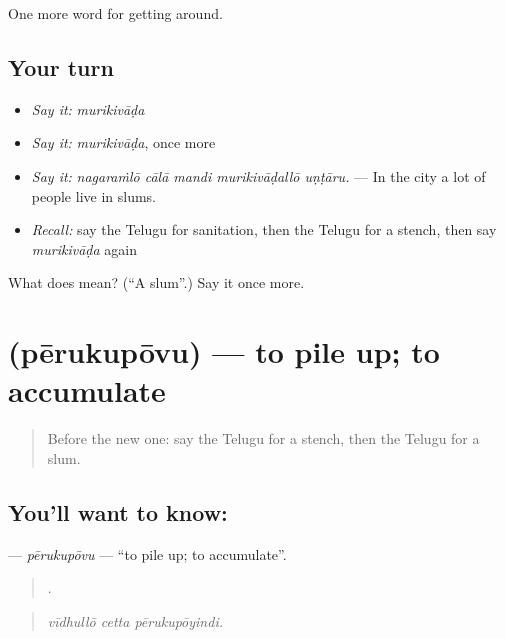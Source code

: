 \begin{grammarlens}[title={What you've built}]
One more word for getting around.
\end{grammarlens}

\subsection*{Your turn}
\begin{itemize}
\raggedright
  \item \emph{Say it:} \emph{murikivāḍa}
  \item \emph{Say it:} \emph{murikivāḍa}, once more
  \item \emph{Say it:} \emph{nagaraṁlō cālā mandi murikivāḍallō uṇṭāru.} — In the city a lot of people live in slums.
  \item \emph{Recall:} say the Telugu for sanitation, then the Telugu for a stench, then say \emph{murikivāḍa} again
\end{itemize}

\begin{tcolorbox}[breakable,colback=teal!4,colframe=teal!35!black,title={Before you move on}]
What does  mean? (\textquotedblleft{}A slum\textquotedblright{}.) Say it once more.
\end{tcolorbox}
\section[\texorpdfstring{\te{పేరుకుపోవు} (pērukupōvu)}{పేరుకుపోవు (pērukupōvu)}]{ (pērukupōvu) — to pile up; to accumulate}

\label{lesson:TE-C468-perukupovu}



\begin{quote}
Before the new one: say the Telugu for a stench, then the Telugu for a slum.
\end{quote}

\subsection*{You'll want to know: }
\textbf{} — \emph{pērukupōvu} — \textquotedblleft{}to pile up; to accumulate\textquotedblright{}.

\begin{quote}
  .
\end{quote}

\begin{quote}
\emph{vīdhullō cetta pērukupōyindi.}
\end{quote}

